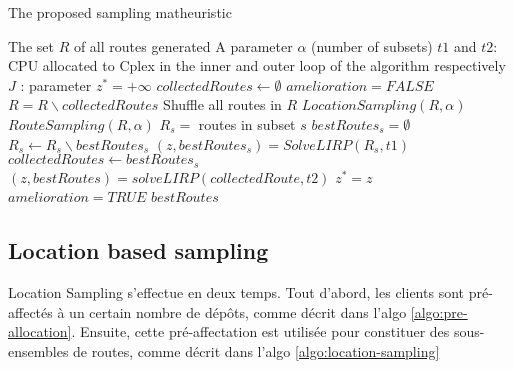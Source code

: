 \documentclass[a4paper,10pt]{article}
\begin{document}
\begin{linenumbers}
\begin{algorithm}
	\caption{The proposed sampling matheuristic}
	\label{mainalgo}
	\begin{algorithmic}[1]
		\REQUIRE  The set $R$ of all routes generated
		\REQUIRE A parameter $\alpha$ (number of subsets)
		\REQUIRE $t1$ and $t2$: CPU allocated to Cplex in the inner and outer loop of the algorithm respectively
		\REQUIRE $J$ : parameter
		\STATE $z^*= +\infty$
		\STATE $collectedRoutes \leftarrow \emptyset$
		\REPEAT
			\STATE $amelioration = FALSE$
			\STATE $R =  R \backslash collectedRoutes$
			\STATE Shuffle all routes in $R$
			\STATE $LocationSampling(R,\alpha)$ 
			\STATE $RouteSampling(R,\alpha)$	
				\STATE $R_s = $ routes in subset $s$
				\STATE $bestRoutes_s = \emptyset$
					\STATE $R_s \leftarrow R_s \backslash bestRoutes_s$ 
					\STATE $(z,bestRoutes_s) = SolveLIRP(R_s,t1)$ 
					\STATE $collectedRoutes \leftarrow bestRoutes_s$
				\ENDFOR
			\ENDFOR
			\STATE 	$(z,bestRoutes) = solveLIRP(collectedRoute, t2)$
				\STATE $z^*=z$
				\STATE $amelioration =TRUE$
			\ENDIF
		\RETURN $bestRoutes$
	\end{algorithmic}
\end{algorithm}


\subsection{Location based sampling}

Location Sampling s'effectue en deux temps. 
Tout d'abord, les clients sont pré-affectés à un certain nombre de dépôts, comme décrit dans l'algo \ref{algo:pre-allocation}.
Ensuite, cette pré-affectation est utilisée pour constituer des sous-ensembles de routes, comme décrit dans l'algo 	\ref{algo:location-sampling}



\end{linenumbers}
\end{document}
